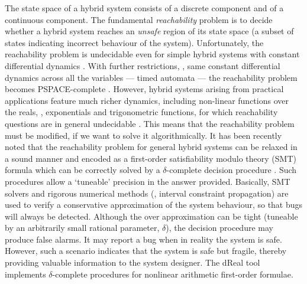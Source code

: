 The state space of a hybrid system consists of a discrete component and of a continuous component. 
The fundamental {\em reachability} problem is to decide whether a hybrid system reaches an {\em unsafe} 
region of its state space (a subset of states indicating incorrect behaviour of the system).
Unfortunately, the reachability problem is undecidable even for simple hybrid systems with constant 
differential dynamics \cite{DBLP:conf/hybrid/AlurCHH92}. 
With further restrictions, \eg, same constant differential dynamics across all the variables --- 
timed automata --- the reachability problem becomes PSPACE-complete \cite{DBLP:conf/icalp/AlurD90}.
However, hybrid systems arising from practical applications feature much richer dynamics, including
non-linear functions over the reals, \eg, exponentials and trigonometric functions,
for which reachability questions are in general undecidable \cite{Richardson68}.
This means that the reachability problem must be modified, if we want to solve it algorithmically.
It has been recently noted that the reachability problem for general hybrid systems can be relaxed 
in a sound manner and encoded as a first-order satisfiability modulo theory (SMT) 
formula \cite{DBLP:conf/lics/GaoAC12} which can be correctly solved by a $\delta$-complete decision 
procedure \cite{DBLP:conf/cade/GaoAC12}. 
Such procedures allow a `tuneable' precision in the answer provided. Basically, SMT solvers and 
rigorous numerical methods (\eg, interval constraint propagation) are used 
to verify a conservative approximation of the system behaviour, so that bugs will always be detected. 
Although the over approximation can be tight (tuneable by an arbitrarily small rational parameter, 
$\delta$), the decision procedure may produce false alarms. It may report a bug when in reality 
the system is safe. However, such a scenario indicates that the system is safe but fragile, thereby 
providing valuable information to the system designer. The dReal tool \cite{DBLP:conf/cade/GaoKC13}
implements $\delta$-complete procedures for nonlinear arithmetic first-order formulae.

